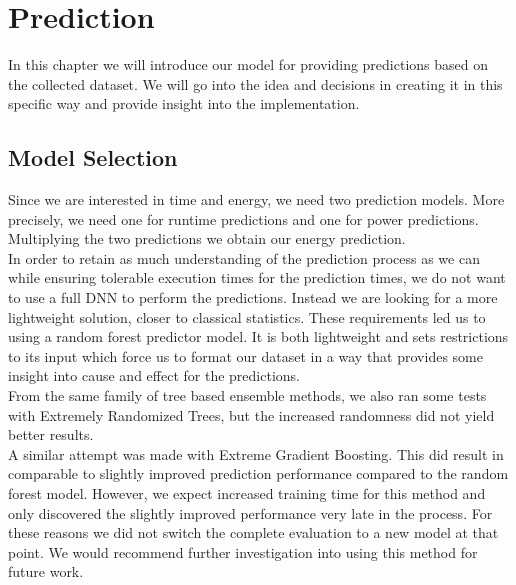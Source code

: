 \chapter{Prediction}\label{chap:contrib2}

In this chapter we will introduce our model for providing predictions based on the collected dataset. We will go into the idea and decisions in creating it in this specific way and provide insight into the implementation.


\section{Model Selection}
Since we are interested in time and energy, we need two prediction models. More precisely, we need one for runtime predictions and one for power predictions. Multiplying the two predictions we obtain our energy prediction. \\
In order to retain as much understanding of the prediction process as we can while ensuring tolerable execution times for the prediction times, we do not want to use a full DNN to perform the predictions. Instead we are looking for a more lightweight solution, closer to classical statistics. These requirements led us to using a random forest predictor model. It is both lightweight and sets restrictions to its input which force us to format our dataset in a way that provides some insight into cause and effect for the predictions. \\
From the same family of tree based ensemble methods, we also ran some tests with Extremely Randomized Trees, but the increased randomness did not yield better results. \\
A similar attempt was made with Extreme Gradient Boosting. This did result in comparable to slightly improved prediction performance compared to the random forest model. However, we expect increased training time for this method and only discovered the slightly improved performance very late in the process. For these reasons we did not switch the complete evaluation to a new model at that point. We would recommend further investigation into using this method for future work.





